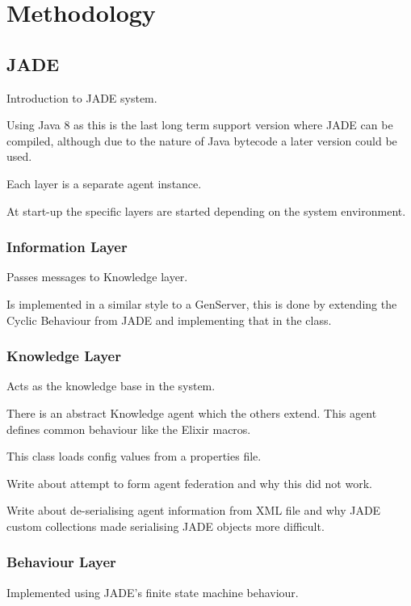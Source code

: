 \section{Methodology}



\subsection{JADE}

Introduction to JADE system.

Using Java 8 as this is the last long term support version where JADE can be compiled, although due to the nature of Java bytecode a later version could be used.

Each layer is a separate agent instance.

At start-up the specific layers are started depending on the system environment.

\subsubsection{Information Layer}

Passes messages to Knowledge layer.

Is implemented in a similar style to a GenServer, this is done by extending the Cyclic Behaviour from JADE and implementing that in the class.

\subsubsection{Knowledge Layer}

Acts as the knowledge base in the system.

There is an abstract Knowledge agent which the others extend.
This agent defines common behaviour like the Elixir macros.

This class loads config values from a properties file.

Write about attempt to form agent federation and why this did not work.

Write about de-serialising agent information from XML file and why JADE custom collections made serialising JADE objects more difficult.

\subsubsection{Behaviour Layer}

Implemented using JADE's finite state machine behaviour.

